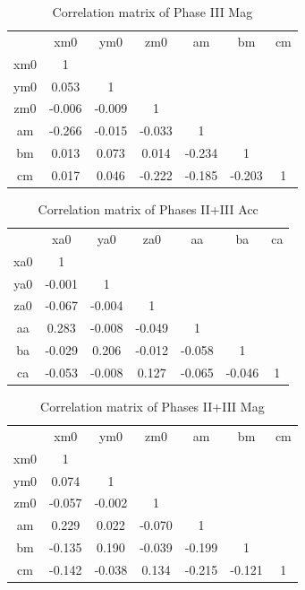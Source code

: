 \begin{table}[H]
    \centering
    \begin{tabular}{c|c|c|c|c|c|c}
             &   xm0  & ym0    &   zm0  &   am   &   bm   & cm \\
         xm0 &  1     &        &        &        &        &    \\
         ym0 &  0.053 &  1     &        &        &        &    \\
         zm0 & -0.006 & -0.009 &  1     &        &        &    \\
         am  & -0.266 & -0.015 & -0.033 &  1     &        &    \\
         bm  &  0.013 &  0.073 &  0.014 & -0.234 &  1     &    \\
         cm  &  0.017 &  0.046 & -0.222 & -0.185 & -0.203 & 1  \\
    \end{tabular}
    \caption{Correlation matrix of Phase III Mag}
\end{table}

\begin{table}[H]
    \centering
    \begin{tabular}{c|c|c|c|c|c|c}
             &   xa0  &   ya0  &   za0  &   aa   &   ba   & ca \\
         xa0 &  1     &        &        &        &        &    \\
         ya0 & -0.001 &  1     &        &        &        &    \\
         za0 & -0.067 & -0.004 &  1     &        &        &    \\
         aa  &  0.283 & -0.008 & -0.049 &  1     &        &    \\
         ba  & -0.029 &  0.206 & -0.012 & -0.058 &  1     &    \\
         ca  & -0.053 & -0.008 &  0.127 & -0.065 & -0.046 &  1 \\
    \end{tabular}
    \caption{Correlation matrix of Phases II+III Acc}
\end{table}

\begin{table}[H]
    \centering
    \begin{tabular}{c|c|c|c|c|c|c}
             &   xm0  & ym0    &   zm0  &   am   &   bm   & cm \\
         xm0 &  1     &        &        &        &        &    \\
         ym0 &  0.074 &  1     &        &        &        &    \\
         zm0 & -0.057 & -0.002 &  1     &        &        &    \\
         am  &  0.229 &  0.022 & -0.070 &  1     &        &    \\
         bm  & -0.135 &  0.190 & -0.039 & -0.199 &  1     &    \\
         cm  & -0.142 & -0.038 &  0.134 & -0.215 & -0.121 & 1  \\
    \end{tabular}
    \caption{Correlation matrix of Phases II+III Mag}
\end{table}

